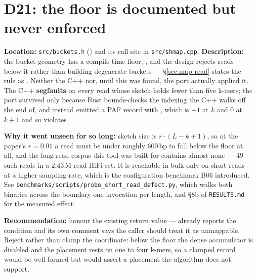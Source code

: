 \section{D21: the  floor is documented but never enforced}
\label{sec:d21}
\textbf{Location:} \texttt{src/buckets.h} () and its call site in
\texttt{src/shmap.cpp}. \textbf{Description:} the bucket geometry has a compile-time floor,
, and the design rejects reads below it rather than building degenerate
buckets --- \S\ref{sec:map-read} states the rule as . Neither the C++ nor, until this was found, the port actually applied it. The C++
\textbf{segfaults} on every read whose sketch holds fewer than five k-mers; the port survived only
because Rust bounds-checks the indexing the C++ walks off the end of, and instead emitted a PAF
record with , which is $-1$ at $k$ and $0$ at $k{+}1$ and so
violates .

\textbf{Why it went unseen for so long:} sketch size is $r \cdot (L - k + 1)$, so at the paper's
$r = 0.01$ a read must be under roughly 600\,bp to fall below the floor at all, and the long-read
corpus this tool was built for contains almost none --- 49 such reads in a 2.43\,M-read HiFi set.
It is reachable in bulk only on short reads at a higher sampling rate, which is the configuration
benchmark B06 introduced. See \texttt{benchmarks/scripts/probe\_short\_read\_defect.py}, which walks
both binaries across the boundary one invocation per length, and \S8b of \texttt{RESULTS.md} for the
measured effect.

\textbf{Recommendation:} honour the existing return value ---  already reports
the condition and its own comment says the caller should treat it as unmappable. Reject rather than
clamp the coordinate: below the floor the dense accumulator is disabled and the placement rests on
one to four k-mers, so a clamped record would be well formed but would assert a placement the
algorithm does not support.
